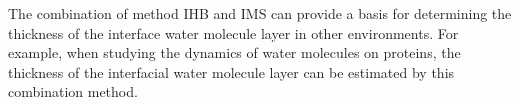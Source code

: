 The combination of method IHB and IMS can provide a basis for determining the thickness of the interface water molecule layer in other environments. 
For example, when studying the dynamics of water molecules on proteins, the thickness of the interfacial water molecule layer can be estimated by this combination method.




